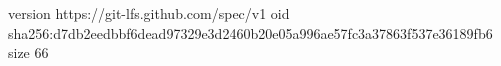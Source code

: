 version https://git-lfs.github.com/spec/v1
oid sha256:d7db2eedbbf6dead97329e3d2460b20e05a996ae57fc3a37863f537e36189fb6
size 66
